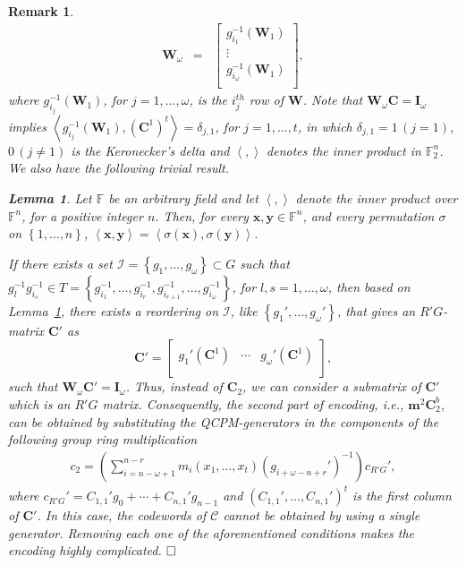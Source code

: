 \documentclass[journal,draftclsnofoot,onecolumn,12pt,twoside]{IEEEtran}
\newtheorem{lemma}[theorem]{Lemma}
\newtheorem{rem}{Remark}[section]
\begin{document}
\begin{rem}
\begin{eqnarray}
  \mathbf{W}_{\omega} &=&\left[
           \begin{array}{c}
             g_{i_1}^{-1}(\mathbf{W}_1) \\
             \vdots \\
             g_{i_{\omega}}^{-1}(\mathbf{W}_1) \\
           \end{array}
         \right],
\end{eqnarray}
where $g_{i_j}^{-1}(\mathbf{W}_1)$, for $j=1,\ldots ,\omega$, is the $i_j^{th}$ row of $\mathbf{W}$. Note that  $\mathbf{W}_{\omega}\mathbf{C}=\mathbf{I}_{\omega}$ implies $\left\langle g_{i_j}^{-1}(\mathbf{W}_1),(\mathbf{C}^1)^{t}\right\rangle =\delta_{j,1}$, for $j=1,\ldots ,t$, in which $\delta_{j,1}=1\,(j=1)$, $0\,(j\neq 1)$ is the Keronecker's delta and $\left\langle ,\right\rangle$ denotes the inner product in $\mathbb{F}_2^n$. We also have the following trivial result.
\begin{lemma}\label{permute}
Let $\mathbb{F}$ be an arbitrary field and let $\left\langle ,\right\rangle$ denote the inner product over $\mathbb{F}^n$, for a positive integer $n$. Then, for every $\mathbf{x},\mathbf{y}\in \mathbb{F}^n$, and every permutation $\sigma$ on $\left\{1,\ldots , n\right\}$,  $\left\langle \mathbf{x},\mathbf{y} \right\rangle=\left\langle \sigma(\mathbf{x}),\sigma(\mathbf{y})\right\rangle$.
\end{lemma}

If there exists a set $\mathcal{I}=\left\{g_1,\ldots ,g_{\omega}\right\}\subset G$ such that $g_l^{-1}g_{i_s}^{-1}\in T=\left\{g_{i_1}^{-1},\ldots ,g_{i_r}^{-1},g_{i_{r+1}}^{-1},\ldots, g_{i_{\omega}}^{-1}\right\}$, for $l,s=1,\ldots ,\omega$, then based on Lemma~\ref{permute}, there exists a reordering on $\mathcal{I}$, like $\left\{g_1',\ldots ,g_{\omega}'\right\}$, that gives  an $R'G$-matrix $\mathbf{C}'$ as $$\mathbf{C}'=\left[
                         \begin{array}{ccc}
                           g_1'(\mathbf{C}^1) & \cdots & g_{\omega}'(\mathbf{C}^1) \\
                         \end{array}
                       \right],$$
such that $\mathbf{W}_{\omega}\mathbf{C}'=\mathbf{I}_{\omega}$.
Thus, instead of $\mathbf{C}_2$, we can consider a submatrix of $\mathbf{C}'$ which is  an $R'G$ matrix. Consequently, the second part of encoding, i.e., $\mathbf{m}^2\mathbf{C}_2^b$, can be obtained by substituting the QCPM-generators in the components of the following group ring multiplication
\begin{eqnarray}
c_2= \left(\sum_{i=n-\omega+1}^{n-r}m_i(x_1,\ldots ,x_t)(g_{i+\omega-n+r}')^{-1} \right)c_{R'G}',
\end{eqnarray}
where $c_{R'G}'=C_{1,1}'g_{0}+\cdots +C_{n,1}'g_{n-1}$ and $(C_{1,1}',\ldots ,C_{n,1}')^t$ is the first column of $\mathbf{C}'$. In this case, the codewords of $\mathcal{C}$ cannot be obtained by using a single generator. Removing each one of the aforementioned  conditions makes the encoding highly complicated.
$\hfill\square$\end{rem}
\end{document}
